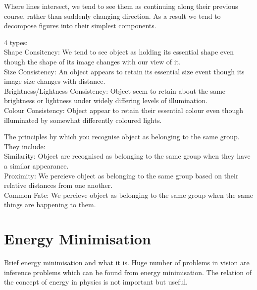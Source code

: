 \begin{definition}
	Where lines intersect, we tend to see them as continuing along their previous course, rather than suddenly changing direction. As a result we tend to decompose figures into their simplest components.
\end{definition}

\begin{definition}
	4 types:\\
	Shape Consitency: We tend to see object as holding its essential shape even though the shape of its image changes with our view of it.\\
	Size Consistency: An object appears to retain its essential size event though its image size changes with distance.\\
	Brightness/Lightness Consistency: Object seem to retain about the same brightness or lightness under widely differing levels of illumination.\\
	Colour Consistency: Object appear to retain their essential colour even though illuminated by somewhat differently coloured lights.
\end{definition}

\begin{definition}
	The principles by which  you recognise object as belonging to the same group. They include:\\
	Similarity: Object are recognised as belonging to the same group when they have a similar appearance.\\
	Proximity: We percieve object as belonging to the same group based on their relative distances from one another. \\
	Common Fate: We percieve object as belonging to the same group when the same things are happening to them.
\end{definition}


\section{Energy Minimisation}

Brief energy minimisation and what it is. Huge number of problems in vision are inference problems which can be found from energy minimisation. The relation of the concept of energy in physics is not important but useful.

